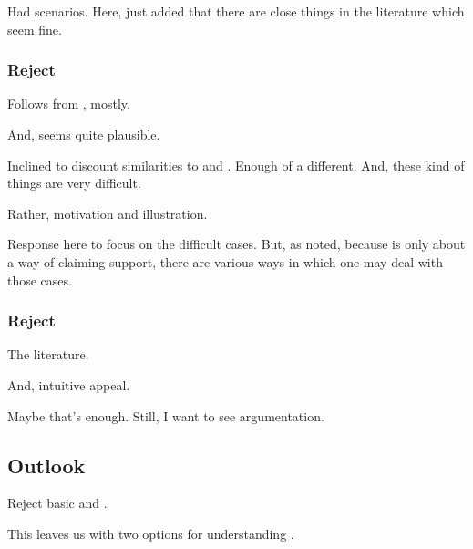 \begin{note}
  Had scenarios.
  Here, just added that there are close things in the literature which seem fine.
\end{note}


\subsubsection{Reject \nI{}}
\label{sec:reject-ni}

\begin{note}
  Follows from \eiS{}, mostly.

  And, \eiS{} seems quite plausible.
\end{note}

\begin{note}
  Inclined to discount similarities to \citeauthor{Wright:2011wn} and \citeauthor{Weisberg:2010to}.
  Enough of a different.
  And, these kind of things are very difficult.
\end{note}

\begin{note}
  Rather, motivation and illustration.
\end{note}

\begin{note}
  Response here to focus on the difficult cases.
  But, as noted, because \nI{} is only about a way of claiming support, there are various ways in which one may deal with those cases.
\end{note}

\subsubsection{Reject \ESU{}}
\label{sec:reject-esu}

\begin{note}
  The literature.

  And, intuitive appeal.

  Maybe that's enough.
  Still, I want to see argumentation.
\end{note}

\subsection{Outlook}
\label{sec:outlook}

\begin{note}
  Reject \AR{} basic and \ESU{}.

  This leaves us with two options for understanding .
\end{note}


